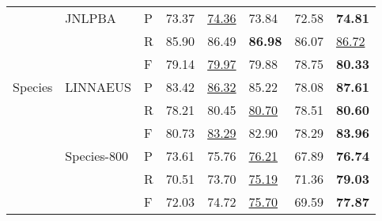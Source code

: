 \documentclass{article}
\begin{document}
\begin{table}[ht!]
{\begin{tabular}{L{2cm}L{2cm}P{1cm}P{2cm}P{2cm}P{2.5cm}P{2.5cm}P{2.5cm}}
                     & JNLPBA & P & 73.37 & \underline{74.36} & 73.84 & 72.58 & \textbf{74.81}\\
                     &  & R & 85.90 & 86.49 & \textbf{86.98} & 86.07 & \underline{86.72}\\
                     &  & F & 79.14 & \underline{79.97} & 79.88 & 78.75 & \textbf{80.33}\\
        
        Species      & LINNAEUS & P & 83.42 & \underline{86.32} & 85.22 & 78.08 & \textbf{87.61}\\
                     &  & R & 78.21 & 80.45 & \underline{80.70} & 78.51 & \textbf{80.60}\\
                     &  & F & 80.73 & \underline{83.29} & 82.90 & 78.29 & \textbf{83.96}\\
                     
                     & Species-800 & P & 73.61 & 75.76 & \underline{76.21} & 67.89 & \textbf{76.74}\\
                     &  & R & 70.51 & 73.70 & \underline{75.19} & 71.36 & \textbf{79.03}\\
                     &  & F & 72.03 & 74.72 & \underline{75.70} & 69.59 & \textbf{77.87}\\
                   \bottomrule
    \end{tabular}}
    \vspace{10pt}
    
\end{table}
\end{document}
